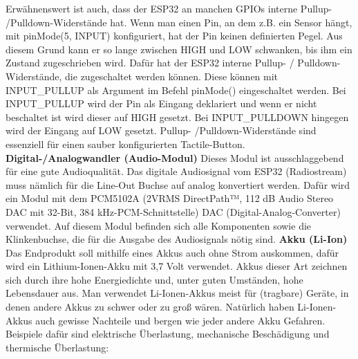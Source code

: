 \documentclass[11pt, twoside]{article}
\begin{document}
Erwähnenswert ist auch, dass der ESP32 an manchen GPIOs interne Pullup- /Pulldown-Widerstände hat. \glqq Wenn man einen Pin, an dem z.B. ein Sensor hängt, mit pinMode(5, INPUT) konfiguriert, hat der Pin keinen definierten Pegel.
Aus diesem Grund kann er so lange zwischen HIGH und LOW schwanken, bis ihm ein Zustand zugeschrieben wird. Dafür hat der ESP32 interne Pullup- / Pulldown-Widerstände, die zugeschaltet werden können. Diese können mit INPUT\_PULLUP als Argument im Befehl pinMode() eingeschaltet werden.
Bei INPUT\_PULLUP wird der Pin als Eingang deklariert und wenn er nicht beschaltet ist wird dieser auf HIGH gesetzt.
Bei INPUT\_PULLDOWN hingegen wird der Eingang auf LOW gesetzt.\grqq{} \parencite{noauthor_urlnl08_nodate} \newline
Pullup- /Pulldown-Widerstände sind essenziell für einen sauber konfigurierten Tactile-Button.
\vspace{4mm} \newline
\parencite[vgl.][]{noauthor_urlnl06_nodate}\newline
\parencite[vgl.][]{noauthor_urlnl07_2023}\newline
\parencite[vgl.][]{noauthor_urlnl08_nodate}
\vspace{4mm}\newline
\textbf{Digital-/Analogwandler (Audio-Modul)}\newline
Dieses Modul ist ausschlaggebend für eine gute Audioqualität. Das digitale Audiosignal vom ESP32 (Radiostream) muss nämlich für die Line-Out Buchse auf analog konvertiert werden. Dafür wird ein Modul mit dem PCM5102A (\glqq 2VRMS DirectPath™, 112 dB Audio Stereo DAC mit 32-Bit, 384 kHz-PCM-Schnittstelle\grqq{}) DAC (Digital-Analog-Converter) verwendet. Auf diesem Modul befinden sich alle Komponenten sowie die Klinkenbuchse, die für die Ausgabe des Audiosignals nötig sind.
\vspace{4mm} \newline
\parencite[vgl.][]{noauthor_urlnl09_nodate}
\vspace{4mm}\newline
\textbf{Akku (Li-Ion)}\newline
Das Endprodukt soll mithilfe eines Akkus auch ohne Strom auskommen, dafür wird ein Lithium-Ionen-Akku mit 3,7 Volt verwendet. Akkus dieser Art zeichnen sich durch ihre hohe Energiedichte und, unter guten Umständen, hohe Lebensdauer aus. Man verwendet Li-Ionen-Akkus meist für (tragbare) Geräte, in denen andere Akkus zu schwer oder zu groß wären. \parencite[vgl.][]{noauthor_urlnl10_nodate} \vspace{4mm}\newline
Natürlich haben Li-Ionen-Akkus auch gewisse Nachteile und bergen wie jeder andere Akku Gefahren. Beispiele dafür sind elektrische Überlastung, mechanische Beschädigung und thermische Überlastung:
\end{document}

